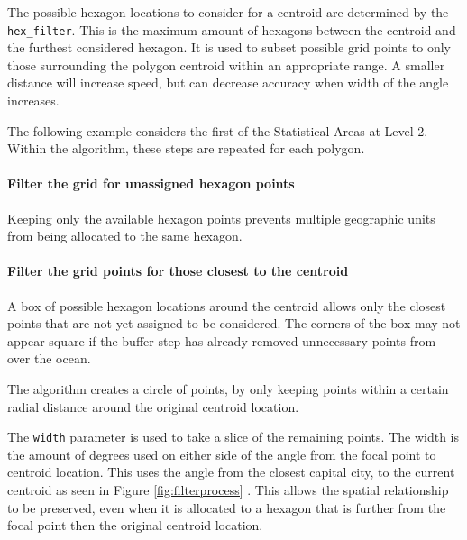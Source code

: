 The possible hexagon locations to consider for a centroid are determined
by the \texttt{hex\_filter}. This is the maximum amount of hexagons
between the centroid and the furthest considered hexagon. It is used to
subset possible grid points to only those surrounding the polygon
centroid within an appropriate range. A smaller distance will increase
speed, but can decrease accuracy when width of the angle increases.

The following example considers the first of the Statistical Areas at
Level 2. Within the algorithm, these steps are repeated for each
polygon.

\hypertarget{filter-the-grid-for-unassigned-hexagon-points}{%
\paragraph{Filter the grid for unassigned hexagon
points}\label{filter-the-grid-for-unassigned-hexagon-points}}

Keeping only the available hexagon points prevents multiple geographic
units from being allocated to the same hexagon.

\hypertarget{filter-the-grid-points-for-those-closest-to-the-centroid}{%
\paragraph{Filter the grid points for those closest to the
centroid}\label{filter-the-grid-points-for-those-closest-to-the-centroid}}

A box of possible hexagon locations around the centroid allows only the
closest points that are not yet assigned to be considered. The corners
of the box may not appear square if the buffer step has already removed
unnecessary points from over the ocean.

The algorithm creates a circle of points, by only keeping points within
a certain radial distance around the original centroid location.

The \texttt{width} parameter is used to take a slice of the remaining
points. The width is the amount of degrees used on either side of the
angle from the focal point to centroid location. This uses the angle
from the closest capital city, to the current centroid as seen in Figure
\ref{fig:filterprocess} . This allows the spatial relationship to be
preserved, even when it is allocated to a hexagon that is further from
the focal point then the original centroid location.

